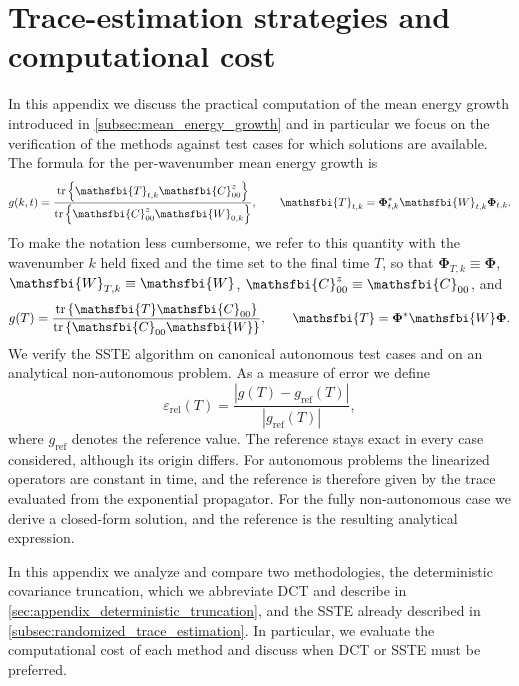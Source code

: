 \section{Trace-estimation strategies and computational cost}
\label{sec:appendix_main}
In this appendix we discuss the practical computation of the mean energy growth introduced in
\cref{subsec:mean_energy_growth} and in particular we focus on the verification of the methods against test cases for which solutions are available. The formula for the per-wavenumber mean energy growth is
\begin{equation}
  g(k,t)
  =
  \frac{
    \tr\left\{\mathsfbi{T}_{t,k}\mathsfbi{C}_{00}^{z}\right\}
  }{
    \tr\left\{\mathsfbi{C}_{00}^{z}\mathsfbi{W}_{0,k}\right\}
  },
  \qquad
  \mathsfbi{T}_{t,k}
  =
  \boldsymbol{\Phi}_{t,k}^{*}\mathsfbi{W}_{t,k}\boldsymbol{\Phi}_{t,k}.
  \label{eq:appendix_modal_growth}
\end{equation}
To make the notation less cumbersome, we refer to this quantity with the wavenumber \(k\) held
fixed and the time set to the final time \(T\), so that \(\boldsymbol{\Phi}_{T,k}\equiv\boldsymbol{\Phi}\),
\(\mathsfbi{W}_{T,k}\equiv\mathsfbi{W}\), \(\mathsfbi{C}_{00}^{z}\equiv\mathsfbi{C}_{00}\), and
\begin{equation}
  g(T)
  =
  \frac{
    \tr\left\{\mathsfbi{T}\mathsfbi{C}_{00}\right\}
  }{
    \tr\left\{\mathsfbi{C}_{00}\mathsfbi{W}\right\}
  },
  \qquad
  \mathsfbi{T}
  =
  \boldsymbol{\Phi}^{*}\mathsfbi{W}\boldsymbol{\Phi}.
  \label{eq:appendix_growth_functional}
\end{equation}
We verify the SSTE algorithm on canonical autonomous test cases and on an analytical non-autonomous problem. As a measure of error we define
\begin{equation}
  \varepsilon_{\mathrm{rel}}(T)
  =
  \frac{
    \left|g(T)-g_{\mathrm{ref}}(T)\right|
  }{
    \left|g_{\mathrm{ref}}(T)\right|
  },
  \label{eq:verification_relative_error}
\end{equation}
where \(g_{\mathrm{ref}}\) denotes the reference value. The reference stays exact in every case considered, although its origin differs. For autonomous problems the linearized operators are constant in time, and the reference is therefore given by the trace evaluated from the exponential propagator. For the fully non-autonomous case we derive a closed-form solution, and the reference is the resulting analytical expression.

In this appendix we analyze and compare two methodologies, the deterministic covariance truncation,
which we abbreviate DCT and describe in \cref{sec:appendix_deterministic_truncation}, and the SSTE
already described in \cref{subsec:randomized_trace_estimation}. In particular, we evaluate the
computational cost of each method and discuss when DCT or SSTE must be preferred.


